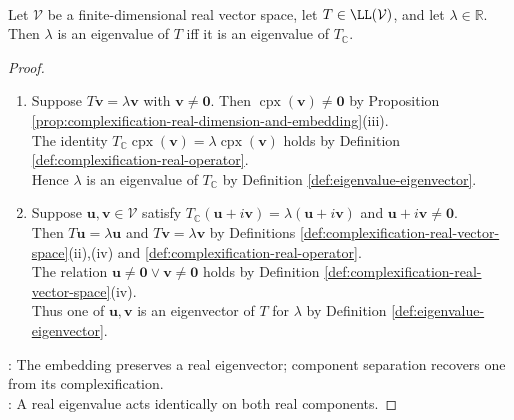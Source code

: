 \begin{proposition} \label{prop:real-eigenvalues-complexification} \\
Let $\mathcal{V}$ be a finite-dimensional real vector space, let $T\in\LL(\mathcal{V})$, and let $\lambda\in\mathbb{R}$. Then $\lambda$ is an eigenvalue of $T$ iff it is an eigenvalue of $T_{\mathbb{C}}$.
\begin{proof}
\begin{enumerate}[label=\roman*.]
\setlength{\itemsep}{0pt}
\item[$(\Rightarrow)$] Suppose $T\mathbf{v}=\lambda\mathbf{v}$ with $\mathbf{v}\neq\mathbf{0}$. Then $\operatorname{cpx}(\mathbf{v})\neq\mathbf{0}$ by Proposition \ref{prop:complexification-real-dimension-and-embedding}(iii).\\
The identity $T_{\mathbb{C}}\operatorname{cpx}(\mathbf{v})=\lambda\operatorname{cpx}(\mathbf{v})$ holds by Definition \ref{def:complexification-real-operator}.\\
Hence $\lambda$ is an eigenvalue of $T_{\mathbb{C}}$ by Definition \ref{def:eigenvalue-eigenvector}.
\item[$(\Leftarrow)$] Suppose $\mathbf{u},\mathbf{v}\in\mathcal{V}$ satisfy $T_{\mathbb{C}}(\mathbf{u}+i\mathbf{v})=\lambda(\mathbf{u}+i\mathbf{v})$ and $\mathbf{u}+i\mathbf{v}\neq\mathbf{0}$.\\
Then $T\mathbf{u}=\lambda\mathbf{u}$ and $T\mathbf{v}=\lambda\mathbf{v}$ by Definitions \ref{def:complexification-real-vector-space}(ii),(iv) and \ref{def:complexification-real-operator}.\\
The relation $\mathbf{u}\neq\mathbf{0}\lor\mathbf{v}\neq\mathbf{0}$ holds by Definition \ref{def:complexification-real-vector-space}(iv).\\
Thus one of $\mathbf{u},\mathbf{v}$ is an eigenvector of $T$ for $\lambda$ by Definition \ref{def:eigenvalue-eigenvector}.
\end{enumerate}
: The embedding preserves a real eigenvector; component separation recovers one from its complexification.\\
: A real eigenvalue acts identically on both real components.
\end{proof}
\end{proposition}

